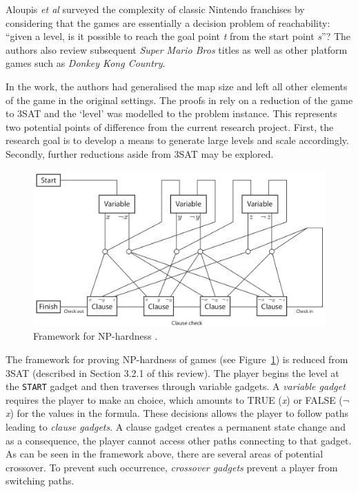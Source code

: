 \documentclass[11pt, a4paper, oneside]{report} %
\begin{document}
Aloupis \textit{et al} \cite{Aloupis2012} surveyed the complexity of classic Nintendo franchises by
considering that the games are essentially a decision problem of reachability: ``given a level, is
it possible to reach the goal point \textit{t} from the start point \textit{s}''? The authors also
review subsequent \textit{Super Mario Bros} titles as well as other platform games such as
\textit{Donkey Kong Country}. 

In the work, the authors had generalised the map size and left all other elements of the game in the
original settings. The proofs in \cite{Aloupis2012} rely on a reduction of the game to 3SAT and the
`level' was modelled to the problem instance. This represents two potential points of difference from
the current research project. First, the research goal is to develop a means to generate large
levels and scale accordingly. Secondly, further reductions aside from 3SAT may be explored.  \\

\begin{figure}[h!]
  
  \centering
    \includegraphics[scale=0.35]{aloupis_nphardness}
  \caption{Framework for NP-hardness \cite{Aloupis2012}.}
  \label{NP_hard}
\end{figure}

The framework for proving NP-hardness of games (see Figure~\ref{NP_hard}) is reduced from 3SAT (described in Section 3.2.1 of
this review). The player begins the level at the \texttt{START} gadget and then traverses through
variable gadgets. A \textit{variable gadget} requires the player to make an choice, which amounts to
TRUE (\textit{x}) or FALSE (\( \neg \)\textit{x}) for the values in the formula. These decisions
allows the player to follow paths leading to \textit{clause gadgets}. A clause gadget creates a
permanent state change and as a consequence, the player cannot access other paths connecting to that
gadget. As can be seen in the framework above, there are several areas of potential crossover. To
prevent such occurrence, \textit{crossover gadgets} prevent a player from switching paths.
\end{document}
